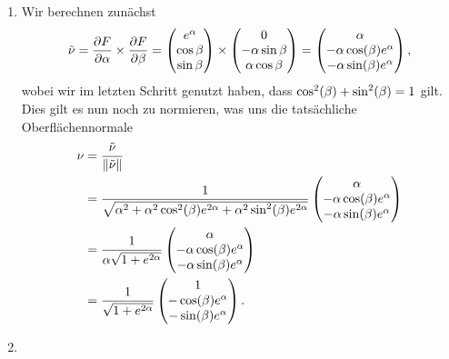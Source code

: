 \documentclass{exercise}
\begin{document}
	\begin{enumerate}
		\item Wir berechnen zunächst
		\[
			\tilde{\nu} = \frac{\partial F}{\partial\alpha} \times \frac{\partial F}{\partial\beta} = \begin{pmatrix}
				e^{\alpha}\\
				\cos\beta\\
				\sin\beta
			\end{pmatrix} \times \begin{pmatrix}
				0\\
				-\alpha\sin\beta\\
				\alpha\cos\beta
			\end{pmatrix} = \begin{pmatrix}
				\alpha\\
				-\alpha\cos\parentheses*{\beta}e^\alpha\\
				-\alpha\sin\parentheses*{\beta}e^\alpha
			\end{pmatrix},
		\]
		wobei wir im letzten Schritt genutzt haben, dass \(\cos^2\parentheses*{\beta} + \sin^2\parentheses*{\beta} = 1\) gilt.
		Dies gilt es nun noch zu normieren, was uns die tatsächliche Oberflächennormale
		\begin{align*}
			\nu &= \frac{\tilde{\nu}}{\norm*{\tilde{\nu}}}\\
			&= \frac{1}{\sqrt{\alpha^2 + \alpha^2 \cos^2\parentheses*{\beta}e^{2\alpha} + \alpha^2 \sin^2\parentheses*{\beta}e^{2\alpha}}}\begin{pmatrix}
				\alpha\\
				-\alpha\cos\parentheses*{\beta}e^\alpha\\
				-\alpha\sin\parentheses*{\beta}e^\alpha
			\end{pmatrix}\\
			&= \frac{1}{\alpha\sqrt{1 + e^{2\alpha}}}\begin{pmatrix}
				\alpha\\
				-\alpha\cos\parentheses*{\beta}e^\alpha\\
				-\alpha\sin\parentheses*{\beta}e^\alpha
			\end{pmatrix}\\
			&= \frac{1}{\sqrt{1 + e^{2\alpha}}}\begin{pmatrix}
				1\\
				-\cos\parentheses*{\beta}e^\alpha\\
				-\sin\parentheses*{\beta}e^\alpha
			\end{pmatrix}.
		\end{align*}
		\item

\end{enumerate}
\end{document}

